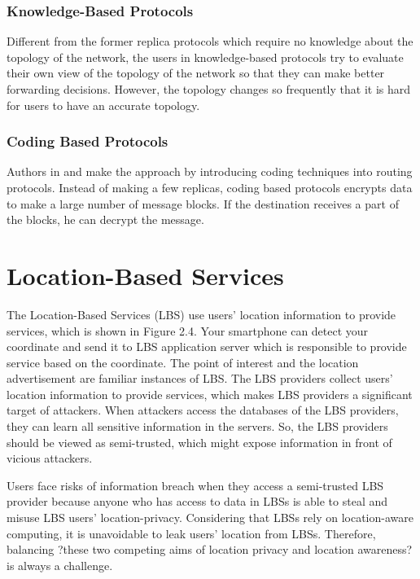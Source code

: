 \subsubsection{  Knowledge-Based Protocols}

\noindent Different from the former replica protocols which require no knowledge about the topology of the network, the users in knowledge-based protocols try to evaluate their own view of the topology of the network so that they can make better forwarding decisions. However, the topology changes so frequently that it is hard for users to have an accurate topology.


\subsubsection{ Coding Based Protocols}

\noindent Authors in \cite {C12} and \cite {C13} make the approach by introducing coding techniques into routing protocols. Instead of making a few replicas, coding based protocols encrypts data to make a large number of message blocks. If the destination receives a part of the blocks, he can decrypt the message.

\section{ Location-Based Services}

\noindent The Location-Based Services (LBS) use users' location information to provide services, which is shown in Figure 2.4. Your smartphone can detect your coordinate and send it to LBS application server which is responsible to provide service based on the coordinate. The point of interest and the location advertisement are familiar instances of LBS. The LBS providers collect users' location information to provide services, which makes LBS providers a significant target of attackers. When attackers access the databases of the LBS providers, they can learn all sensitive information in the servers. So, the LBS providers should be viewed as semi-trusted, which might expose information in front of vicious attackers.

Users face risks of information breach when they access a semi-trusted LBS provider because anyone who has access to data in LBSs is able to steal and misuse LBS users' location-privacy. Considering that LBSs rely on location-aware computing, it is unavoidable to leak users' location from LBSs. Therefore, balancing ?these two competing aims of location privacy and location awareness? \cite {C20} is always a challenge.

